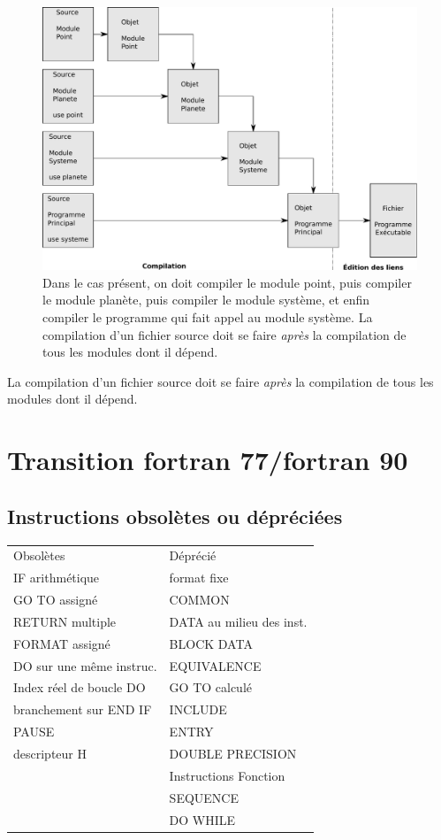 \documentclass[a4paper,twoside]{article}
\begin{document}
\begin{figure}[htb]
\centering
\includegraphics[width=0.65\linewidth]{figure/compilation_modulaire.pdf}
\caption{Dans le cas présent, on doit compiler le module point, puis compiler le module planète, puis compiler le module système, et enfin compiler le programme qui fait appel au module système. La compilation d'un fichier source doit se faire \emph{après} la compilation de tous les modules dont il dépend.}\label{fig:compilation_modulaire}
\end{figure}

\begin{attention}
La compilation d'un fichier source doit se faire \emph{après} la compilation de tous les modules dont il dépend.
\end{attention}


\section{Transition fortran 77/fortran 90}
\subsection{Instructions obsolètes ou dépréciées}

\begin{center}
\begin{tabular}{ll}
Obsolètes & Déprécié\\
IF arithmétique & format fixe\\
GO TO assigné & COMMON\\
RETURN multiple & DATA au milieu des inst.\\
FORMAT assigné & BLOCK DATA\\
DO sur une même instruc. & EQUIVALENCE\\
Index réel de boucle DO & GO TO calculé\\
branchement sur END IF & INCLUDE\\
PAUSE & ENTRY\\
descripteur H & DOUBLE PRECISION\\
 & Instructions Fonction\\
 & SEQUENCE\\
 & DO WHILE
\end{tabular}
\end{center}
\end{document}
